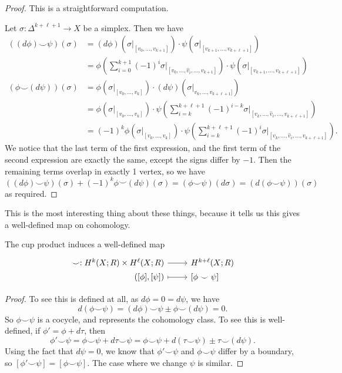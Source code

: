 \documentclass[a4paper]{article}
\theoremstyle{definition}
\begin{document}
\begin{proof}
  This is a straightforward computation.

  Let $\sigma: \Delta^{k + \ell + 1} \to X$ be a simplex. Then we have
  \begin{align*}
    ((d \phi)\smile \psi)(\sigma) &= (d \phi)(\sigma|_{[v_0, \ldots, v_{k + 1}]}) \cdot \psi(\sigma|_{[v_{k + 1}, \ldots, v_{k + \ell + 1}]})\\
    &= \phi\left(\sum_{i = 0}^{k + 1} (-1)^i \sigma|_{[v_0, \ldots, \hat{v}_i, \ldots, v_{k + 1}]}\right) \cdot \psi(\sigma|_{[v_{k + 1}, \ldots, v_{k + \ell + 1}]})\\
    (\phi \smile (d \psi))(\sigma) &= \phi(\sigma|_{[v_0, \ldots, v_k]}) \cdot (d \psi)(\sigma|_{v_k,\ldots, v_{k + \ell + 1}]})\\
    &=\phi(\sigma|_{[v_0, \ldots, v_k]}) \cdot \psi\left(\sum_{i = k}^{k + \ell + 1} (-1)^{i - k} \sigma|_{[v_k, \ldots, \hat{v}_i, \ldots, v_{k + \ell + 1}]}\right)\\
    &=(-1)^k \phi(\sigma|_{[v_0, \ldots, v_k]}) \cdot \psi\left(\sum_{i = k}^{k + \ell + 1} (-1)^{i} \sigma|_{[v_k, \ldots, \hat{v}_i, \ldots, v_{k + \ell + 1}]}\right).
  \end{align*}
  We notice that the last term of the first expression, and the first term of the second expression are exactly the same, except the signs differ by $-1$. Then the remaining terms overlap in exactly 1 vertex, so we have
  \[
    ((d \phi) \smile \psi)(\sigma) + (-1)^k \phi \smile (d \psi)(\sigma) = (\phi \smile \psi)(d \sigma) = (d (\phi \smile \psi))(\sigma)
  \]
  as required.
\end{proof}
This is the most interesting thing about these things, because it tells us this gives a well-defined map on cohomology.

\begin{cor}
  The cup product induces a well-defined map
  \[
    \begin{tikzcd}[row sep = 0ex
        ,/tikz/column 1/.append style={anchor=base east}
        ,/tikz/column 2/.append style={anchor=base west}
      ]
      \smile: H^k(X; R) \times H^\ell(X; R) \ar[r] & H^{k + \ell}(X; R)\\
      ([\phi], [\psi] ) \ar[r, maps to] & \lbrack\phi \smile \psi\rbrack
    \end{tikzcd}
  \]
\end{cor}

\begin{proof}
  To see this is defined at all, as $d \phi = 0 = d \psi$, we have
  \[
    d (\phi \smile \psi) = (d \phi) \smile \psi \pm \phi \smile (d \psi) = 0.
  \]
  So $\phi \smile \psi$ is a cocycle, and represents the cohomology class. To see this is well-defined, if $\phi' = \phi + d\tau$, then
  \[
    \phi' \smile \psi = \phi \smile \psi + d \tau \smile \psi = \phi \smile \psi + d(\tau \smile \psi) \pm \tau \smile (d \psi).
  \]
  Using the fact that $d \psi = 0$, we know that $\phi' \smile \psi$ and $\phi \smile \psi$ differ by a boundary, so $[\phi' \smile \psi] = [\phi \smile \psi]$. The case where we change $\psi$ is similar.
\end{proof}
\end{document}
